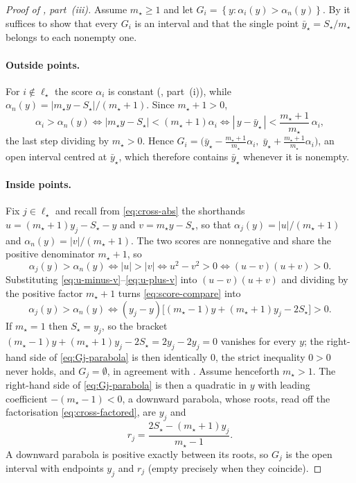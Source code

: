 \documentclass[twoside]{article}
\numberwithin{equation}{section}
\theoremstyle{plain}
\theoremstyle{definition}
\theoremstyle{remark}
\newcommand{\set}[1]{\left\{#1\right\}}
\newcommand{\abs}[1]{\left\lvert #1 \right\rvert}
\begin{document}
\begin{proof}[Proof of , part~(iii)]
Assume $m_\star \ge 1$ and let $G_i = \set{y : \alpha_i(y) > \alpha_n(y)}$. By
 it suffices to show that every $G_i$ is an interval and that the
single point $\bar{y}_\star = S_\star/m_\star$ belongs to each nonempty one.

\paragraph{Outside points.}
For $i \notin \ell_\star$ the score $\alpha_i$ is constant (,
part~(i)), while $\alpha_n(y) = \abs{m_\star y - S_\star}/(m_\star+1)$. Since $m_\star+1 > 0$,
\[
  \alpha_i > \alpha_n(y)
  \iff \abs{m_\star y - S_\star} < (m_\star+1)\alpha_i
  \iff \abs{\,y - \bar{y}_\star\,} < \frac{m_\star+1}{m_\star}\,\alpha_i,
\]
the last step dividing by $m_\star > 0$. Hence
$G_i = \bigl(\bar{y}_\star - \tfrac{m_\star+1}{m_\star}\alpha_i,\;
\bar{y}_\star + \tfrac{m_\star+1}{m_\star}\alpha_i\bigr)$, an open interval centred at
$\bar{y}_\star$, which therefore contains $\bar{y}_\star$ whenever it is nonempty.

\paragraph{Inside points.}
Fix $j \in \ell_\star$ and recall from \eqref{eq:cross-abs} the shorthands
$u = (m_\star+1)y_j - S_\star - y$ and $v = m_\star y - S_\star$, so that
$\alpha_j(y) = \abs{u}/(m_\star+1)$ and $\alpha_n(y) = \abs{v}/(m_\star+1)$. The two scores
are nonnegative and share the positive denominator $m_\star+1$, so
\begin{equation}\label{eq:score-compare}
  \alpha_j(y) > \alpha_n(y)
  \iff \abs{u} > \abs{v}
  \iff u^2 - v^2 > 0
  \iff (u-v)(u+v) > 0 .
\end{equation}
Substituting \eqref{eq:u-minus-v}--\eqref{eq:u-plus-v} into $(u-v)(u+v)$ and dividing by the
positive factor $m_\star+1$ turns \eqref{eq:score-compare} into
\begin{equation}\label{eq:Gj-parabola}
  \alpha_j(y) > \alpha_n(y)
  \iff (y_j - y)\bigl[(m_\star-1)y + (m_\star+1)y_j - 2S_\star\bigr] > 0 .
\end{equation}
If $m_\star = 1$ then $S_\star = y_j$, so the bracket
$(m_\star-1)y + (m_\star+1)y_j - 2S_\star = 2y_j - 2y_j = 0$ vanishes for every $y$; the
right-hand side of \eqref{eq:Gj-parabola} is then identically $0$, the strict inequality
$0 > 0$ never holds, and $G_j = \emptyset$, in agreement with . Assume
henceforth $m_\star > 1$. The right-hand side of
\eqref{eq:Gj-parabola} is then a quadratic in $y$ with leading coefficient
$-(m_\star-1) < 0$, a downward parabola, whose roots, read off the factorisation
\eqref{eq:cross-factored}, are $y_j$ and
\[
  r_j = \frac{2S_\star - (m_\star+1)y_j}{m_\star-1} .
\]
A downward parabola is positive exactly between its roots, so $G_j$ is the open interval
with endpoints $y_j$ and $r_j$ (empty precisely when they coincide).


\end{proof}
\end{document}
